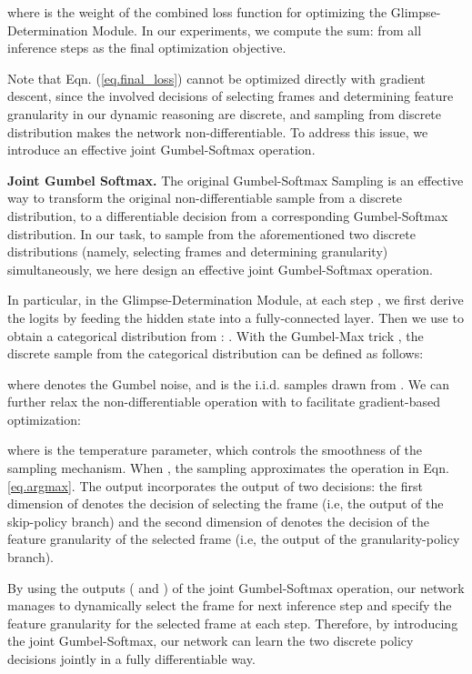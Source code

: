 \documentclass[final]{cvpr}
\begin{document}
where  is the weight of the combined loss function for optimizing the Glimpse-Determination Module.
In our experiments, we compute the sum:  from all inference steps as the final optimization objective. 

Note that Eqn. (\ref{eq.final_loss}) cannot be optimized directly with gradient descent, since the involved decisions of selecting frames and determining feature granularity in our dynamic reasoning are discrete, and sampling from discrete distribution makes the network non-differentiable. To address this issue, we introduce an effective joint Gumbel-Softmax operation.

{\bf Joint Gumbel Softmax.} The original Gumbel-Softmax Sampling \cite{jang2016categorical} is an effective way to transform the original non-differentiable sample from a discrete distribution, to a differentiable decision from a corresponding Gumbel-Softmax distribution. In our task, to sample from the aforementioned two discrete distributions (namely, selecting frames and determining granularity) simultaneously, we here design an effective joint Gumbel-Softmax operation. 

In particular, in the Glimpse-Determination Module, at each step , we first derive the logits  by feeding the hidden state  into a fully-connected layer. 
Then we use  to obtain a categorical distribution  from :
.
With the Gumbel-Max trick \cite{jang2016categorical}, the discrete sample from the categorical distribution  can be defined as follows:

where  denotes the Gumbel noise, and  is the i.i.d. samples drawn from . We can further relax the non-differentiable operation  with  to facilitate gradient-based optimization:

where  is the temperature parameter, which controls the smoothness of the sampling mechanism. When , the sampling approximates the  operation in Eqn. \ref{eq.argmax}. The output  incorporates the output of two decisions: the first dimension of  denotes the decision of selecting the frame (i.e, the output  of the skip-policy branch) and the second dimension of  denotes the decision of the feature granularity of the selected frame (i.e, the output  of the granularity-policy branch).

By using the outputs ( and ) of the joint Gumbel-Softmax operation, our network manages to dynamically select the frame for next inference step and specify the feature granularity for the selected frame at each step. 
Therefore, by introducing the joint Gumbel-Softmax, our network can learn the two discrete policy decisions jointly in a fully differentiable way.
\end{document}
